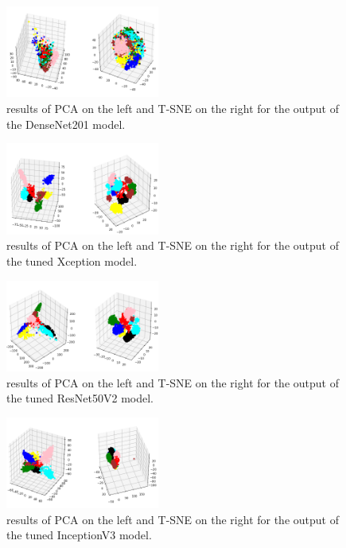 \documentclass[conference]{IEEEtran}
\begin{document}
\begin{figure}[htbp]
\centerline{\includegraphics[width=0.45\textwidth]{DenseNet_3d}}
\caption{results of PCA on the left and T-SNE on the right for the output of the DenseNet201 model.}
\label{DenseNet_3d}
\end{figure}

\begin{figure}
\centerline{\includegraphics[width=0.45\textwidth]{Xception_fine}}
\caption{results of PCA on the left and T-SNE on the right for the output of the tuned Xception model.}
\label{Xception_fine}
\end{figure}
\begin{figure}[htbp]
\centerline{\includegraphics[width=0.45\textwidth]{ResNet_fine}}
\caption{results of PCA on the left and T-SNE on the right for the output of the tuned ResNet50V2 model.}
\label{ResNet_fine}
\end{figure}
\begin{figure}[htbp]
\centerline{\includegraphics[width=0.45\textwidth]{Inception_fine}}
\caption{results of PCA on the left and T-SNE on the right for the output of the tuned InceptionV3 model.}
\label{Inception_fine}
\end{figure}
\end{document}
